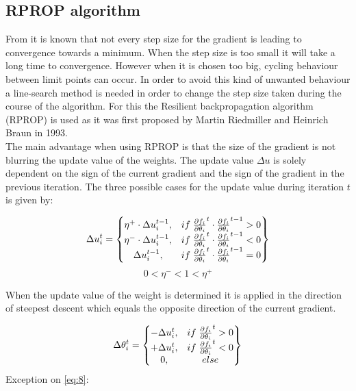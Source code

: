 
\subsection{RPROP algorithm}\label{s:RPROP}
From \cite{Panos_opti} it is known that not every step size for the gradient is leading to convergence towards a minimum. When the step size is too small it will take a long time to convergence. However when it is chosen too big, cycling behaviour between limit points can occur. In order to avoid this kind of unwanted behaviour a line-search method is needed in order to change the step size taken during the course of the algorithm. For this the Resilient backpropagation algorithm (RPROP) \cite{RPROP} is used as it was first proposed by Martin Riedmiller and Heinrich Braun in 1993.\\

The main advantage when using RPROP is that the size of the gradient is not blurring the update value of the weights. The update value $\Delta u$ is solely dependent on the sign of the current gradient and the sign of the gradient in the previous iteration. The three possible cases for the update value during iteration $t$ is given by: 

\begin{equation}\label{eq:7}
	\Delta u^t_i =
	\begin{Bmatrix}
		 \eta^+ \cdot \Delta u^{t-1}_i, & if \hspace{1 mm} \pdv{f_i}{\theta_i}^t \cdot \pdv{f_i}{\theta_i}^{t-1} > 0 \\
		 \eta^- \cdot \Delta u^{t-1}_i, & if \hspace{1 mm} \pdv{f_i}{\theta_i}^t \cdot \pdv{f_i}{\theta_i}^{t-1} < 0 \\
		  \Delta u^{t-1}_i, & if \hspace{1 mm} \pdv{f_i}{\theta_i}^t \cdot \pdv{f_i}{\theta_i}^{t-1} = 0 \\
	\end{Bmatrix}
\end{equation}
\begin{equation}\label{eq:9}
0 <\eta^-<1<\eta^+
\end{equation}

When the update value of the weight is determined it is applied in the direction of steepest descent which equals the opposite direction of the current gradient. 

\begin{equation}\label{eq:8}
\Delta \theta^t_i =
\begin{Bmatrix}
	-\Delta u^t_i, & if \hspace{1 mm} \pdv{f_i}{\theta_i}^t > 0 \\
	+ \Delta u^t_i, & if \hspace{1 mm} \pdv{f_i}{\theta_i}^t < 0 \\
	0, & else 
\end{Bmatrix}
\end{equation}
Exception on \ref{eq:8}:

